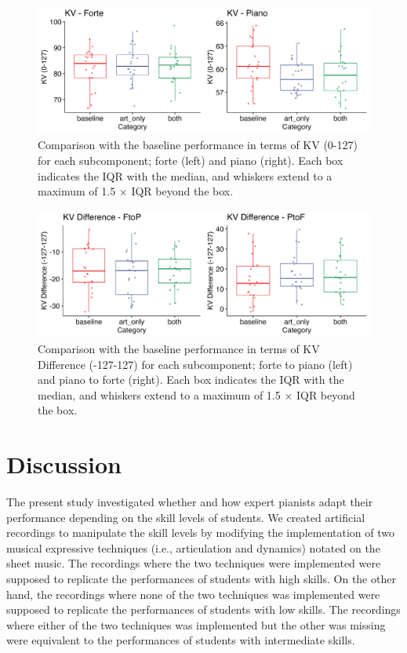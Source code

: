 \documentclass[
  man]{apa6}
\begin{document}
\begin{figure}
\includegraphics[width=1\linewidth]{manuscript_files/figure-latex/plot-vel-2-1} \caption{\label{fig:vel-2}Comparison with the baseline performance in terms of KV (0-127) for each subcomponent; forte (left) and piano (right). Each box indicates the IQR with the median, and whiskers extend to a maximum of 1.5 × IQR beyond the box.}\label{fig:plot-vel-2}
\end{figure}

\begin{figure}
\includegraphics[width=1\linewidth]{manuscript_files/figure-latex/plot-vel-diff-2-1} \caption{\label{fig:vel-diff-2}Comparison with the baseline performance in terms of KV Difference (-127-127) for each subcomponent; forte to piano (left) and piano to forte (right). Each box indicates the IQR with the median, and whiskers extend to a maximum of 1.5 × IQR beyond the box.}\label{fig:plot-vel-diff-2}
\end{figure}

\hypertarget{discussion}{%
\section{Discussion}\label{discussion}}

The present study investigated whether and how expert pianists adapt their performance depending on the skill levels of students. We created artificial recordings to manipulate the skill levels by modifying the implementation of two musical expressive techniques (i.e., articulation and dynamics) notated on the sheet music. The recordings where the two techniques were implemented were supposed to replicate the performances of students with high skills. On the other hand, the recordings where none of the two techniques was implemented were supposed to replicate the performances of students with low skills. The recordings where either of the two techniques was implemented but the other was missing were equivalent to the performances of students with intermediate skills.
\end{document}
